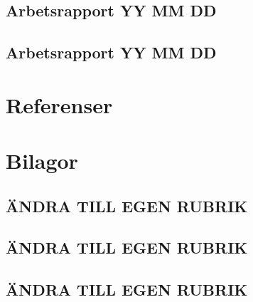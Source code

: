 \documentclass{article}
\begin{document}
\subsection{Arbetsrapport YY MM DD}
\subsection{Arbetsrapport YY MM DD}

\section{Referenser}

\section{Bilagor}
\subsection{ÄNDRA TILL EGEN RUBRIK}
\subsection{ÄNDRA TILL EGEN RUBRIK}
\subsection{ÄNDRA TILL EGEN RUBRIK}







\end{document}
